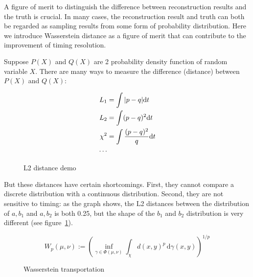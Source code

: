 A figure of merit to distinguish the difference between reconstruction results and the truth is crucial. In many cases, the reconstruction result and truth can both be regarded as sampling results from some form of probability distribution. Here we introduce Wasserstein distance as a figure of merit that can contribute to the improvement of timing resolution. 

Suppose $P(X)$ and $Q(X)$ are 2 probability density function of random variable $X$. There are many ways to measure the difference (distance) between $P(X)$ and $Q(X)$: 

\begin{minipage}{.3\textwidth}
\begin{align*}
    L_{1} &= \int|p-q| \mathrm{d} t \\
    L_{2} &= \int(p-q)^{2} \mathrm{d} t \\
    \chi^{2} &= \int\frac{(p-q)^{2}}{q} \mathrm{d} t \\
    \cdots
\end{align*}
\end{minipage}
\begin{minipage}{.7\textwidth}
\begin{figure}[H]
    \centering
    \scalebox{0.4}{}
    \caption{\label{fig:l2} L2 distance demo}
\end{figure}
\end{minipage}

But these distances have certain shortcomings. First, they cannot compare a discrete distribution with a continuous distribution. Second, they are not sensitive to timing: as the graph shows, the L2 distances between the distribution of $a,b_{1}$ and $a,b_{2}$ is both 0.25, but the shape of the $b_{1}$ and $b_{2}$ distribution is very different (see figure~\ref{fig:l2}). 

\label{sub:Wasserstein distance}
\begin{minipage}{.45\textwidth}
\begin{equation}
    W_{p}(\mu,\nu):=\left(\inf_{\gamma\in\Phi(\mu,\nu)}\int_{\chi}d(x,y)^{p}\,\mathrm{d}\gamma(x,y)\right)^{1/p} \label{eq:w-dist-def}
\end{equation}
\end{minipage}
\begin{minipage}{.55\textwidth}
\begin{figure}[H]
    \centering
    \scalebox{0.4}{}
    \caption{\label{fig:Wasserstein transportation} Wasserstein transportation}
\end{figure}
\end{minipage}

